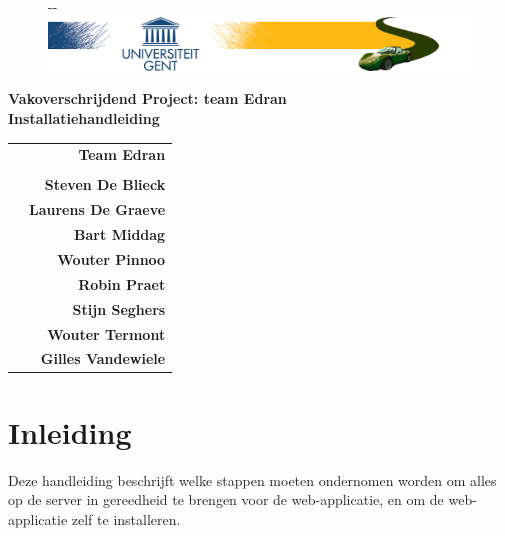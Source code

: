 \documentclass[11pt,a4paper,oneside]{article}
\begin{document}
\begin{titlepage}

\thispagestyle{fancy}
\fancyhf{}
\fancyfoot[L]{}
\begin{figure}[!ht]
  \begin{adjustwidth}{-\oddsidemargin-1in}{-\rightmargin}
    \centering
    \includegraphics[width=\paperwidth]{img/banner}
  \end{adjustwidth}
\end{figure}
\vspace{-0.2em}
\begin{center}
\vspace{5cm}
\Huge \textbf{Vakoverschrijdend Project: team Edran\\ Installatiehandleiding}\\
\vspace{6.0cm}
\large
\begin{tabular}{L! {} R}
& {\LARGE\bf Team Edran} \\
& \\
& {\bf Steven De Blieck} \\
& {\bf Laurens De Graeve} \\
& {\bf Bart Middag} \\
& {\bf Wouter Pinnoo} \\
& {\bf Robin Praet} \\
& {\bf Stijn Seghers} \\
& {\bf Wouter Termont} \\
& {\bf Gilles Vandewiele} \\
\end{tabular}
\end{center}
\end{titlepage}
\restoregeometry
\newpage

\fancyheadoffset[RO,LE]{0in}

\fancyfoot[L]{}
\fancyfoot[C]{\thepage}
\pagestyle{fancy}

\section{Inleiding}
Deze handleiding beschrijft welke stappen moeten ondernomen worden om alles op de server in gereedheid te brengen voor de web-applicatie, en om de web-applicatie zelf te installeren.
\end{document}
